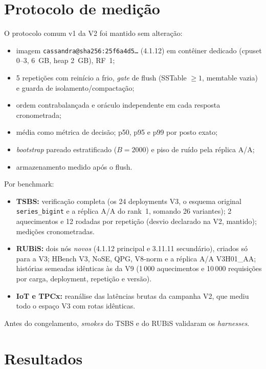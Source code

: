 \documentclass[10pt,a4paper,twoside]{article}
\theoremstyle{definition}\newtheorem{definicao}{Definição}
\begin{document}
\section{Protocolo de medição}
\label{sec:protocolo}

O protocolo comum v1 da V2 foi mantido sem alteração:
\begin{itemize}
\item imagem \texttt{cassandra@sha256:25f6a4d5\ldots} (4.1.12) em contêiner dedicado (cpuset 0--3, 6~GB, heap 2~GB), RF~1;
\item 5 repetições com reinício a frio, \emph{gate} de flush (SSTable $\geq 1$, memtable vazia) e guarda de isolamento/compactação;
\item ordem contrabalançada e oráculo independente em cada resposta cronometrada;
\item média como métrica de decisão; p50, p95 e p99 por posto exato;
\item \emph{bootstrap} pareado estratificado ($B=2000$) e piso de ruído pela réplica A/A;
\item armazenamento medido após o flush.
\end{itemize}

Por benchmark:
\begin{itemize}
\item \textbf{TSBS:} verificação completa (os 24 deployments V3, o esquema original \texttt{series\_bigint} e a réplica
A/A do rank~1, somando 26 variantes); 2 aquecimentos e 12 rodadas por repetição (desvio declarado na V2, mantido);
\tsbsRaw{} medições cronometradas.
\item \textbf{RUBiS:} dois nós \emph{novos} (4.1.12 principal e 3.11.11 secundário), criados só para a V3; HBench V3,
NoSE, QPG, V8-norm e a réplica A/A V3H01\_AA; histórias semeadas idênticas às da V9 (1\,000 aquecimentos e
10\,000 requisições por carga, deployment, repetição e versão).
\item \textbf{IoT e TPCx:} reanálise das latências brutas da campanha V2, que mediu todo o espaço V3 com rotas idênticas.
\end{itemize}
Antes do congelamento, \emph{smokes} do TSBS e do RUBiS validaram os \emph{harnesses}.

\section{Resultados}
\label{sec:resultados}
\end{document}
